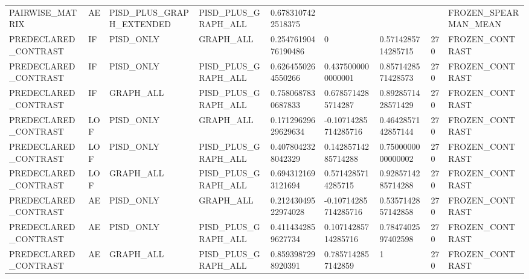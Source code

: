\begin{longtable}{lllllllll}
PAIRWISE\_MATRIX & AE & PISD\_PLUS\_GRAPH\_EXTENDED & PISD\_PLUS\_GRAPH\_ALL & 0.6783107422518375 &  &  &  & FROZEN\_SPEARMAN\_MEAN \\
PREDECLARED\_CONTRAST & IF & PISD\_ONLY & GRAPH\_ALL & 0.25476190476190486 & 0 & 0.5714285714285715 & 270 & FROZEN\_CONTRAST \\
PREDECLARED\_CONTRAST & IF & PISD\_ONLY & PISD\_PLUS\_GRAPH\_ALL & 0.6264550264550266 & 0.4375000000000001 & 0.8571428571428573 & 270 & FROZEN\_CONTRAST \\
PREDECLARED\_CONTRAST & IF & GRAPH\_ALL & PISD\_PLUS\_GRAPH\_ALL & 0.7580687830687833 & 0.6785714285714287 & 0.8928571428571429 & 270 & FROZEN\_CONTRAST \\
PREDECLARED\_CONTRAST & LOF & PISD\_ONLY & GRAPH\_ALL & 0.17129629629629634 & -0.10714285714285716 & 0.4642857142857144 & 270 & FROZEN\_CONTRAST \\
PREDECLARED\_CONTRAST & LOF & PISD\_ONLY & PISD\_PLUS\_GRAPH\_ALL & 0.4078042328042329 & 0.14285714285714288 & 0.7500000000000002 & 270 & FROZEN\_CONTRAST \\
PREDECLARED\_CONTRAST & LOF & GRAPH\_ALL & PISD\_PLUS\_GRAPH\_ALL & 0.6943121693121694 & 0.5714285714285715 & 0.9285714285714288 & 270 & FROZEN\_CONTRAST \\
PREDECLARED\_CONTRAST & AE & PISD\_ONLY & GRAPH\_ALL & 0.21243049522974028 & -0.10714285714285716 & 0.5357142857142858 & 270 & FROZEN\_CONTRAST \\
PREDECLARED\_CONTRAST & AE & PISD\_ONLY & PISD\_PLUS\_GRAPH\_ALL & 0.4114342859627734 & 0.10714285714285716 & 0.7847402597402598 & 270 & FROZEN\_CONTRAST \\
PREDECLARED\_CONTRAST & AE & GRAPH\_ALL & PISD\_PLUS\_GRAPH\_ALL & 0.8593987298920391 & 0.7857142857142859 & 1 & 270 & FROZEN\_CONTRAST \\
\hline
\end{longtable}
